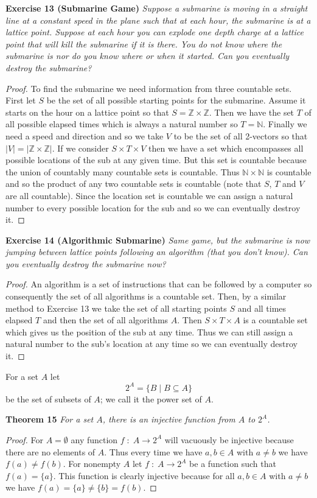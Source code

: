 \documentclass{article}
\begin{document}
\begin{flushleft}
\textbf{Exercise 13 (Submarine Game)}
\textsl{Suppose a submarine is moving in a straight line at a constant speed in the plane such that at each hour, the submarine is at a lattice point. Suppose at each hour you can explode one depth charge at a lattice point that will kill the submarine if it is there. You do not know where the submarine is nor do you know where or when it started. Can you eventually destroy the submarine?}
\begin{proof}
To find the submarine we need information from three countable sets. First let $S$ be the set of all possible starting points for the submarine. Assume it starts on the hour on a lattice point so that $S=\mathbb{Z} \times \mathbb{Z}$. Then we have the set $T$ of all possible elapsed times which is always a natural number so $T = \mathbb{N}$. Finally we need a speed and direction and so we take $V$ to be the set of all 2-vectors so that $|V|=|\mathbb{Z} \times \mathbb{Z}|$. If we consider $S \times T \times V$ then we have a set which encompasses all possible locations of the sub at any given time. But this set is countable because the union of countably many countable sets is countable. Thus $\mathbb{N} \times \mathbb{N}$ is countable and so the product of any two countable sets is countable (note that $S$, $T$ and $V$ are all countable). Since the location set is countable we can assign a natural number to every possible location for the sub and so we can eventually destroy it.
\end{proof}

\textbf{Exercise 14 (Algorithmic Submarine)}
\textsl{Same game, but the submarine is now jumping between lattice points following an algorithm (that you don't know). Can you eventually destroy the submarine now?}
\begin{proof}
An algorithm is a set of instructions that can be followed by a computer so consequently the set of all algorithms is a countable set. Then, by a similar method to Exercise 13 we take the set of all starting points $S$ and all times elapsed $T$ and then the set of all algorithms $A$. Then $S \times T \times A$ is a countable set which gives us the position of the sub at any time. Thus we can still assign a natural number to the sub's location at any time so we can eventually destroy it.
\end{proof}

For a set $A$ let
\[
2^A=\{B \mid B \subseteq A\}
\]
be the set of subsets of $A$; we call it the power set of $A$.

\textbf{Theorem 15}
\textsl{For a set $A$, there is an injective function from $A$ to $2^A$.}
\begin{proof}
For $A = \emptyset$ any function $f \; : \; A \rightarrow 2^A$ will vacuously be injective because there are no elements of $A$. Thus every time we have $a,b \in A$ with $a \neq b$ we have $f(a) \neq f(b)$. For nonempty $A$ let $f \; : \; A \rightarrow 2^A$ be a function such that $f(a) = \{a\}$. This function is clearly injective because for all $a,b \in A$ with $a \neq b$ we have $f(a)=\{a\} \neq \{b\}=f(b)$.
\end{proof}


\end{flushleft}
\end{document}
